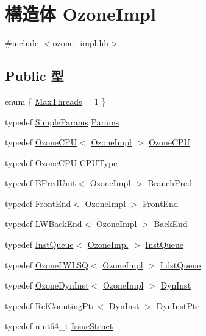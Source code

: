 \hypertarget{structOzoneImpl}{
\section{構造体 OzoneImpl}
\label{structOzoneImpl}
}


{\ttfamily \#include $<$ozone\_\-impl.hh$>$}\subsection*{Public 型}
\begin{DoxyCompactItemize}
\item 
enum \{ \hyperlink{structOzoneImpl_a458e651af6690959efa2afb96be7d609ab491ddc45d51d0ea7f735c1926390fdb}{MaxThreads} =  1
 \}
\item 
typedef \hyperlink{classSimpleParams}{SimpleParams} \hyperlink{structOzoneImpl_a97a13164dd1bc9c081a6c711e68e6160}{Params}
\item 
typedef \hyperlink{classOzoneCPU}{OzoneCPU}$<$ \hyperlink{structOzoneImpl}{OzoneImpl} $>$ \hyperlink{structOzoneImpl_a78611b242a447d62247029586d6a2e4b}{OzoneCPU}
\item 
typedef \hyperlink{classOzoneCPU}{OzoneCPU} \hyperlink{structOzoneImpl_a29cb0c13130cdc0b3376343d5c795b88}{CPUType}
\item 
typedef \hyperlink{classBPredUnit}{BPredUnit}$<$ \hyperlink{structOzoneImpl}{OzoneImpl} $>$ \hyperlink{structOzoneImpl_a490ef9e9d028e5a1ec5cabdec16b71c4}{BranchPred}
\item 
typedef \hyperlink{classFrontEnd}{FrontEnd}$<$ \hyperlink{structOzoneImpl}{OzoneImpl} $>$ \hyperlink{structOzoneImpl_a1f77546932fd687bb136bd55beaf657e}{FrontEnd}
\item 
typedef \hyperlink{classLWBackEnd}{LWBackEnd}$<$ \hyperlink{structOzoneImpl}{OzoneImpl} $>$ \hyperlink{structOzoneImpl_a6e0be62c8e7de750cc20bb6cacf249b6}{BackEnd}
\item 
typedef \hyperlink{classInstQueue}{InstQueue}$<$ \hyperlink{structOzoneImpl}{OzoneImpl} $>$ \hyperlink{structOzoneImpl_a9c97500b4447f101c7d7996cd7324278}{InstQueue}
\item 
typedef \hyperlink{classOzoneLWLSQ}{OzoneLWLSQ}$<$ \hyperlink{structOzoneImpl}{OzoneImpl} $>$ \hyperlink{structOzoneImpl_a5e9f2d9dd0e2c38d642664340beec7be}{LdstQueue}
\item 
typedef \hyperlink{classOzoneDynInst}{OzoneDynInst}$<$ \hyperlink{structOzoneImpl}{OzoneImpl} $>$ \hyperlink{structOzoneImpl_a9f1e17b50571d733df7274a8337f023e}{DynInst}
\item 
typedef \hyperlink{classRefCountingPtr}{RefCountingPtr}$<$ \hyperlink{classOzoneDynInst}{DynInst} $>$ \hyperlink{structOzoneImpl_a97c1adaf6da40f1dd1f86fe0b3b51249}{DynInstPtr}
\item 
typedef uint64\_\-t \hyperlink{structOzoneImpl_ad906a02b6e2b621a30df354fa780da6f}{IssueStruct}
\end{DoxyCompactItemize}


